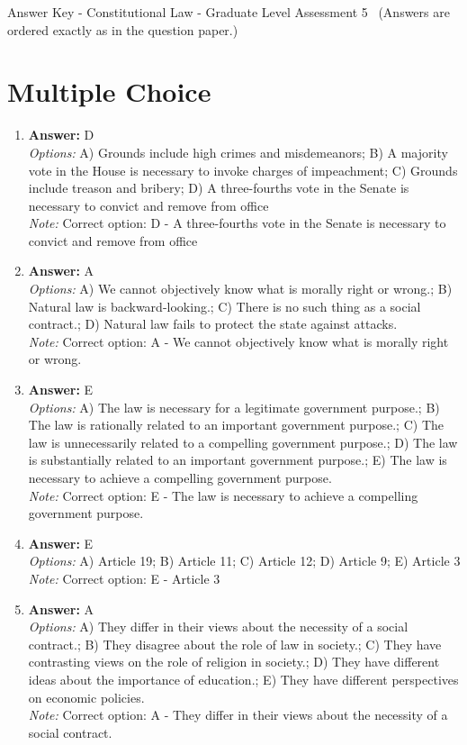 \documentclass[12pt]{article}
\begin{document}
\begin{center}
Answer Key - Constitutional Law - Graduate Level Assessment 5 \
\small (Answers are ordered exactly as in the question paper.)
\end{center}

\section*{Multiple Choice}
\begin{enumerate}[label=\arabic*.]
\item \textbf{Answer:} D
\\ \textit{Options:} A) Grounds include high crimes and misdemeanors; B) A majority vote in the House is necessary to invoke charges of impeachment; C) Grounds include treason and bribery; D) A three-fourths vote in the Senate is necessary to convict and remove from office
\\ \textit{Note:} Correct option: D - A three-fourths vote in the Senate is necessary to convict and remove from office
\item \textbf{Answer:} A
\\ \textit{Options:} A) We cannot objectively know what is morally right or wrong.; B) Natural law is backward-looking.; C) There is no such thing as a social contract.; D) Natural law fails to protect the state against attacks.
\\ \textit{Note:} Correct option: A - We cannot objectively know what is morally right or wrong.
\item \textbf{Answer:} E
\\ \textit{Options:} A) The law is necessary for a legitimate government purpose.; B) The law is rationally related to an important government purpose.; C) The law is unnecessarily related to a compelling government purpose.; D) The law is substantially related to an important government purpose.; E) The law is necessary to achieve a compelling government purpose.
\\ \textit{Note:} Correct option: E - The law is necessary to achieve a compelling government purpose.
\item \textbf{Answer:} E
\\ \textit{Options:} A) Article 19; B) Article 11; C) Article 12; D) Article 9; E) Article 3
\\ \textit{Note:} Correct option: E - Article 3
\item \textbf{Answer:} A
\\ \textit{Options:} A) They differ in their views about the necessity of a social contract.; B) They disagree about the role of law in society.; C) They have contrasting views on the role of religion in society.; D) They have different ideas about the importance of education.; E) They have different perspectives on economic policies.
\\ \textit{Note:} Correct option: A - They differ in their views about the necessity of a social contract.
\end{enumerate}
\end{document}
